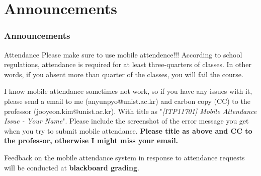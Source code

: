 \section{Announcements}

\begin{frame}
    \frametitle{Announcements}

    \begin{alertblock}{Attendance}
        Please make sure to use mobile attendence!!! According to school regulations, attendance is required for at least three-quarters of classes. In other words, if you absent more than quarter of the classes, you will fail the course. 
    \end{alertblock}

    I know mobile attendance sometimes not work, so if you have any issues with it, please send a email to me (anyunpyo@unist.ac.kr) and carbon copy (CC) to the professor (jooyeon.kim@unist.ac.kr). With title as "\textit{[ITP11701] Mobile Attendance Issue - Your Name}". Please include the screenshot of the error message you get when you try to submit mobile attendance. \textbf{Please title as above and CC to the professor, otherwise I might miss your email.}

    Feedback on the mobile attendance system in response to attendance requests will be conducted at \textbf{blackboard grading}.
\end{frame}